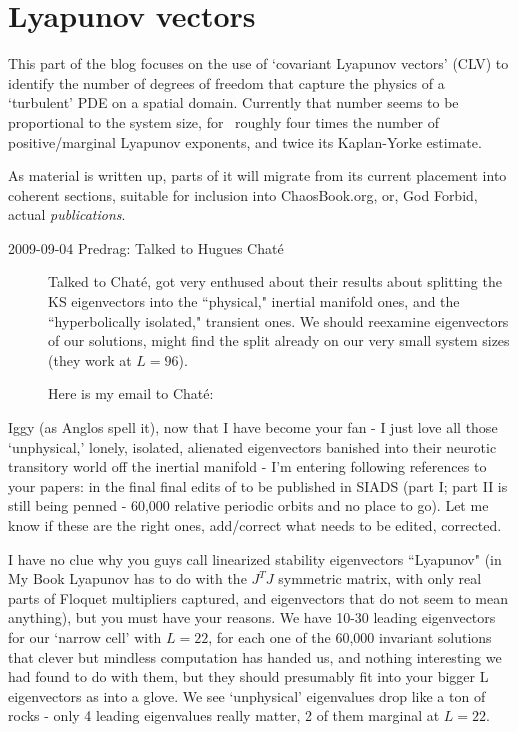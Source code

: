 
\chapter{Lyapunov vectors}
\label{s:LyapunovVec}

This part of the blog focuses on the use of `covariant Lyapunov
vectors' (CLV) to identify the number of degrees of freedom
that capture the physics of a `turbulent' PDE on a spatial
domain. Currently that number seems to be proportional to the
system size, for \KSe\ roughly four times the number of
 positive/marginal Lyapunov exponents, and twice its
Kaplan-Yorke estimate.

As material is written up, parts of it will migrate from its
current placement into coherent sections, suitable for
inclusion into ChaosBook.org, or, God Forbid, actual {\em
publications}.

\begin{description}

\item[2009-09-04 Predrag: Talked to Hugues Chat\'{e}]
Talked to Chat\'{e}, got very
enthused about their results about splitting the KS
eigenvectors into the ``physical," inertial manifold ones,
and the ``hyperbolically isolated," transient ones. We should
reexamine eigenvectors of our solutions, might find the split
already on our very small system sizes (they work at $L=96$).

Here is my email to Chat\'{e}:

\end{description}

Iggy (as Anglos spell it),
%
now that I have become your fan - I just love all those
`unphysical,' lonely, isolated, alienated eigenvectors
banished into their neurotic transitory world off the
inertial manifold -  I'm entering following references to
your papers:
in the final final edits of to be published in SIADS (part I;
part II is still being penned - 60,000 relative periodic
orbits and no place to go). Let me know if these are the
right ones, add/correct what needs to be edited, corrected.

I have no clue why you guys call linearized stability
eigenvectors ``Lyapunov" (in My Book Lyapunov has to do with
the $J^T J$ symmetric matrix, with only real parts of Floquet
multipliers captured, and eigenvectors that do not seem to
mean anything), but you must have your reasons. We have 10-30
leading eigenvectors for our `narrow cell' with $L=22$, for
each one of the 60,000 invariant solutions that clever but
mindless computation has handed us, and nothing interesting
we had found to do with them, but they should presumably fit
into your bigger L eigenvectors as into a glove. We see
`unphysical' eigenvalues drop like a ton of rocks - only 4
leading eigenvalues really matter, 2 of them marginal at
$L=22$.

